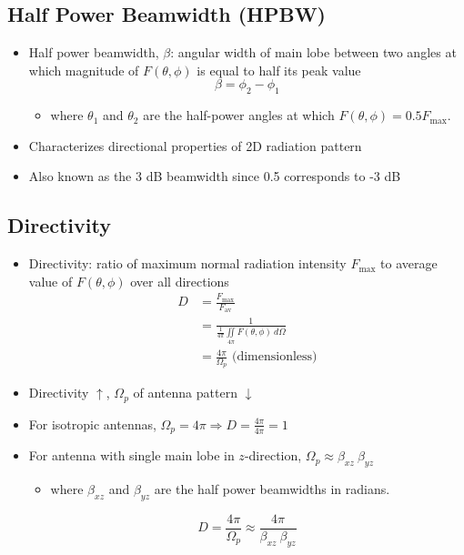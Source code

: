 \documentclass[a4paper]{article}
\begin{document}
\subsection{Half Power Beamwidth (HPBW)}
\begin{itemize}
    \item Half power beamwidth, $\beta$: angular width of main lobe between two angles at which magnitude of $F(\theta, \phi)$ is equal to half its peak value
    $$\beta = \phi_2-\phi_1$$
    \begin{itemize}[label=$\circ$]
        \item where $\theta_1$ and $\theta_2$ are the half-power angles at which $F(\theta, \phi) = 0.5F_\text{max}$.
    \end{itemize}
    \item Characterizes directional properties of 2D radiation pattern
    \item Also known as the 3 dB beamwidth since 0.5 corresponds to -3 dB
\end{itemize}

\newpage
\subsection{Directivity}
\begin{itemize}
    \item Directivity: ratio of maximum normal radiation intensity $F_\text{max}$ to average value of $F(\theta, \phi)$ over all directions
    \begin{align*}
        D &= \frac{{F_\text{max}}}{F_\text{av}}\\
        &= \frac{1}{\displaystyle\frac{1}{4\pi}\iint\limits_{4\pi}F(\theta, \phi)\ d\Omega}\\
        &= \frac{4\pi}{\Omega_p}\text{ (dimensionless)}
    \end{align*}
    \item Directivity $\uparrow$, $\Omega_p$ of antenna pattern $\downarrow$
    \item For isotropic antennas, $\Omega_p = 4\pi \Rightarrow D=\displaystyle\frac{4\pi}{4\pi} = 1$
    \item For antenna with single main lobe in $z$-direction, $\Omega_p \approx \beta_{xz}\ \beta_{yz}$
    \begin{itemize}[label=$\circ$]
        \item where $\beta_{xz}$ and $\beta_{yz}$ are the half power beamwidths in radians.
    \end{itemize}
    $$D = \frac{4\pi}{\Omega_p}\approx\frac{4\pi}{\beta_{xz}\ \beta_{yz}}$$
\end{itemize}
\end{document}
